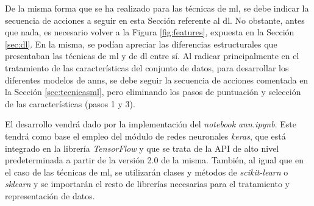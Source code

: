 De la misma forma que se ha realizado para las técnicas de \gls{ml}, se debe indicar la secuencia de acciones a seguir en esta Sección referente al \gls{dl}. No obstante, antes que nada, es necesario volver a la Figura \ref{fig:features}, expuesta en la Sección \ref{sec:dl}. En la misma, se podían apreciar las diferencias estructurales que presentaban las técnicas de \gls{ml} y de \gls{dl} entre sí. Al radicar principalmente en el tratamiento de las características del conjunto de datos, para desarrollar los diferentes modelos de \gls{ann}s, se debe seguir la secuencia de acciones comentada en la Sección \ref{sec:tecnicasml}, pero eliminando los pasos de puntuación y selección de las características (pasos 1 y 3).

\vspace{3mm}

El desarrollo vendrá dado por la implementación del \textit{notebook} \textit{ann.ipynb}. Este tendrá como base el empleo del módulo de redes neuronales \textit{keras}, que está integrado en la librería \textit{TensorFlow} y que se trata de la API de alto nivel predeterminada a partir de la versión 2.0 de la misma. También, al igual que en el caso de las técnicas de \gls{ml}, se utilizarán clases y métodos de \textit{scikit-learn} o \textit{sklearn} y se importarán el resto de librerías necesarias para el tratamiento y representación de datos.




